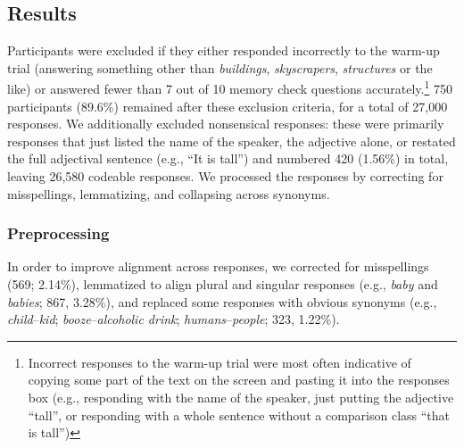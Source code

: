 \documentclass[doc]{apa6}
\begin{document}
\subsection{Results}

Participants were excluded if they either responded incorrectly to the warm-up trial (answering something other than \emph{buildings}, \emph{skyscrapers}, \emph{structures} or the like) or answered fewer than 7 out of 10 memory check questions accurately.\footnote{Incorrect responses to the warm-up trial were most often indicative of copying some part of the text on the screen and pasting it into the responses box (e.g., responding with the name of the speaker, just putting the adjective ``tall'', or responding with a whole sentence without a comparison class ``that is tall'')}
750 participants (89.6\%) remained after these exclusion criteria, for a total of 27,000 responses.
We additionally excluded nonsensical responses: these were primarily responses that just listed the name of the speaker, the adjective alone, or restated the full adjectival sentence (e.g., ``It is tall'') and numbered 420 (1.56\%) in total, leaving 26,580 codeable responses. 
We processed the responses by correcting for misspellings, lemmatizing, and collapsing across synonyms. 



\subsubsection{Preprocessing}

In order to improve alignment across responses, we corrected for misspellings (569; 2.14\%), lemmatized to align plural and singular responses (e.g., \emph{baby} and \emph{babies}; 867, 3.28\%), and replaced some responses with obvious synonyms (e.g., \emph{child}--\emph{kid}; \emph{booze}--\emph{alcoholic drink}; \emph{humans}--\emph{people}; 323, 1.22\%). 
\end{document}
